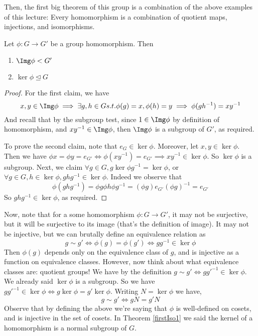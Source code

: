 Then, the first big theorem of this group is a combination of the above examples of this
lecture: Every homomorphism is a combination of quotient maps, injections, and
isomorphisms.
\begin{theorem} 
  Let $\phi:G\to G'$ be a group homomorphism. Then 
  \begin{enumerate}
    \item $\Img\phi < G'$
    \item $\ker\phi \trianglelefteq G$
  \end{enumerate}
  \label{firstIso1}
\end{theorem}
\begin{proof}
  For the first claim, we have
  \[x,y\in\Img\phi \implies \exists g,h\in G s.t. \phi(g)=x,\phi(h)=y \implies
  \phi(gh^{-1})=xy^{-1}\]
  And recall that by the subgroup test, since $1\in\Img\phi$ by definition of
  homomorphism, and $xy^{-1}\in\Img\phi$, then $\Img\phi$ is a subgroup of $G'$, as
  required.

  To prove the second claim, note that $e_G\in\ker\phi$. Moreover, let $x,y\in\ker\phi$.
  Then we have $\phi x = \phi y =e_{G'}\iff \phi (xy^{-1}) = e_{G'} \implies
  xy^{-1}\in\ker\phi$. So $\ker\phi$ is a subgroup. Next, we claim $\forall g\in G,
  g\ker\phi g^{-1}= \ker\phi$, or $\forall g\in G, h\in\ker\phi,ghg^{-1}\in\ker\phi$.
  Indeed we observe that 
  \[\phi(ghg^{-1})= \phi g\phi h \phi g^{-1} = (\phi g)e_{G'} (\phi g)^{-1} = e_{G'}\]
  So $ghg^{-1}\in\ker\phi$, as required.
\end{proof}

Now, note that for a some homomorphism $\phi:G\to G'$, it may not be surjective, but it
will be surjective to its image (that's the definition of image). It may not be injective,
but we can brutally define an equivalence relation as 
\[g\sim g' \iff \phi(g)=\phi(g')\iff gg^{-1}\in \ker\phi\]
Then $\phi(g)$ depends only on the equivalence class of $g$, and is injective as a
function on equivalence classes. However, now think about what equivalence classes are:
quotient groups! We have by the definition $g\sim g' \iff gg'^{-1}\in \ker\phi$. We already
said $\ker\phi$ is a subgroup. So we have $gg'^{-1}\in \ker\phi \iff
g\ker\phi=g'\ker\phi$. Writing $N=\ker\phi$ we have,
\[g\sim g' \iff gN = g'N\]
Observe that by defining the above we're saying that $\phi$ is well-defined on cosets, and
is injective in the set of cosets. In Theorem \ref{firstIso1} we said the kernel of a
homomorphism is a normal subgroup of $G$.

